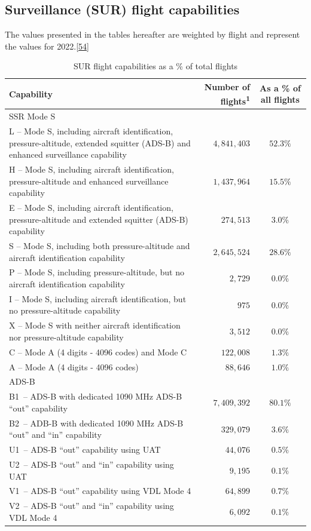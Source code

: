 \documentclass[
  11pt,
  a4paper,
]{book}
\begin{document}
\hypertarget{surveillance-sur-flight-capabilities}{%
\subsection{Surveillance (SUR) flight
capabilities}\label{surveillance-sur-flight-capabilities}}

The values presented in the tables hereafter are weighted by flight and
represent the values for
2022.\protect\hyperlink{ref-cns:dashboard}{{[}54{]}}

\hypertarget{tbl-sur-flight}{}
\setlength{\LTpost}{0mm}
\begin{longtable}{lrc}
\caption{\label{tbl-sur-flight}SUR flight capabilities as a \% of total flights }\tabularnewline

\toprule
Capability & Number of flights\textsuperscript{1} & As a \% of all flights \\ 
\midrule
\multicolumn{3}{l}{SSR Mode S} \\ 
\midrule
L – Mode S, including aircraft identification, pressure-altitude, extended squitter (ADS-B) and enhanced surveillance capability & $4,841,403$ & $52.3\%$ \\ 
H – Mode S, including aircraft identification, pressure-altitude and enhanced surveillance capability & $1,437,964$ & $15.5\%$ \\ 
E – Mode S, including aircraft identification, pressure-altitude and extended squitter (ADS-B) capability & $274,513$ & $3.0\%$ \\ 
S – Mode S, including both pressure-altitude and aircraft identification capability & $2,645,524$ & $28.6\%$ \\ 
P – Mode S, including pressure-altitude, but no aircraft identification capability & $2,729$ & $0.0\%$ \\ 
I – Mode S, including aircraft identification, but no pressure-altitude capability & $975$ & $0.0\%$ \\ 
X – Mode S with neither aircraft identification nor pressure-altitude capability & $3,512$ & $0.0\%$ \\ 
C – Mode A (4 digits - 4096 codes) and Mode C & $122,008$ & $1.3\%$ \\ 
A – Mode A (4 digits - 4096 codes) & $88,646$ & $1.0\%$ \\ 
\midrule
\multicolumn{3}{l}{ADS-B} \\ 
\midrule
B1 – ADS-B with dedicated 1090 MHz ADS-B “out” capability & $7,409,392$ & $80.1\%$ \\ 
B2 – ADB-B with dedicated 1090 MHz ADS-B “out” and “in” capability & $329,079$ & $3.6\%$ \\ 
U1 – ADS-B “out” capability using UAT & $44,076$ & $0.5\%$ \\ 
U2 – ADS-B “out” and “in” capability using UAT & $9,195$ & $0.1\%$ \\ 
V1 – ADS-B “out” capability using VDL Mode 4 & $64,899$ & $0.7\%$ \\ 
V2 – ADS-B “out” and “in” capability using VDL Mode 4 & $6,092$ & $0.1\%$ \\ 
\bottomrule
\end{longtable}
\end{document}

